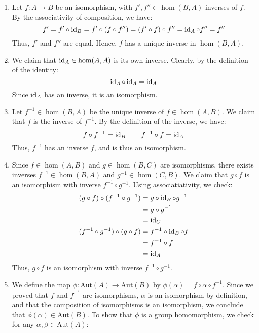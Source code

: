 \documentclass[12pt]{article}
\begin{document}
\begin{solu}
    \bbni
    \begin{enumerate}
        \item Let $f: A \to B$ be an isomorphism, with $f', f'' \in \hom(B, A)$ inverses of $f$. By the associativity of composition, we have: 
        \[ f' = f' \circ \operatorname{id}_B = f' \circ (f \circ f'') = (f' \circ f) \circ f'' = \operatorname{id}_A \circ f'' = f'' \]
        Thus, $f'$ and $f''$ are equal. Hence, $f$ has a unique inverse in $\hom(B,A)$.
        \item We claim that $\operatorname{id}_A \in \hom(A, A)$ is its own inverse. Clearly, by the definition of the identity: 
        \[  \operatorname{id}_A \circ \operatorname{id}_A = \operatorname{id}_A \]
        Since $\operatorname{id}_A$ has an inverse, it is an isomorphism.
        \item Let $f^{-1} \in \hom(B, A)$ be the unique inverse of $f \in \hom(A, B)$. We claim that $f$ is the inverse of $f^{-1}$. By the definition of the inverse, we have:
        \[ f \circ f^{-1} = \operatorname{id}_B \qquad f^{-1} \circ f = \operatorname{id}_A \]
        Thus, $f^{-1}$ has an inverse $f$, and is thus an isomorphism.
        \item Since $f \in \hom(A, B)$ and $g \in \hom(B, C)$ are isomorphisms, there exists inverses $f^{-1} \in \hom(B, A)$ and $g^{-1} \in \hom(C, B)$. We claim that $g \circ f$ is an isomorphism with inverse $f^{-1} \circ g^{-1}$. Using associatiativity, we check: 
        \begin{align*}
            (g \circ f) \circ (f^{-1} \circ g^{-1}) &= g \circ \operatorname{id}_B \circ g^{-1} \\
            &= g \circ g^{-1} \\
            &= \operatorname{id}_C \\
            (f^{-1} \circ g^{-1}) \circ (g \circ f) &= f^{-1} \circ \operatorname{id}_B \circ f \\
            &= f^{-1} \circ f \\
            &= \operatorname{id}_A
        \end{align*}
        Thus, $g \circ f$ is an isomorphism with inverse $f^{-1} \circ g^{-1}$.
        \item We define the map $\phi: \text{Aut}(A) \to \text{Aut}(B)$ by $\phi(\alpha) = f \circ \alpha \circ f^{-1}$. Since we proved that $f$ and $f^{-1}$ are isomorphisms, $\alpha$ is an isomorphism by definition, and that the composition of isomorphisms is an isomorphism, we conclude that $\phi(\alpha) \in \text{Aut}(B)$. To show that $\phi$ is a group homomorphism, we check for any $\alpha, \beta \in \text{Aut}(A)$:
        \begin{align*}

\end{align*}
\end{enumerate}
\end{solu}
\end{document}

